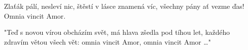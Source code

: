 \repeatingchorus{}
\beginchorus{}
Zlaťák pálí, nesleví nic,
štěstí v lásce znamená víc,
všechny pány ať vezme ďas! 
Omnia vincit Amor.
\endchorus{}

\beginverse{}
"Teď s novou vírou obcházím svět,
má hlava zšedla pod tíhou let,
každého zdravím větou všech vět:
omnia vincit Amor, omnia vincit Amor \ldots{}"
\endverse{}

\endsong{}
